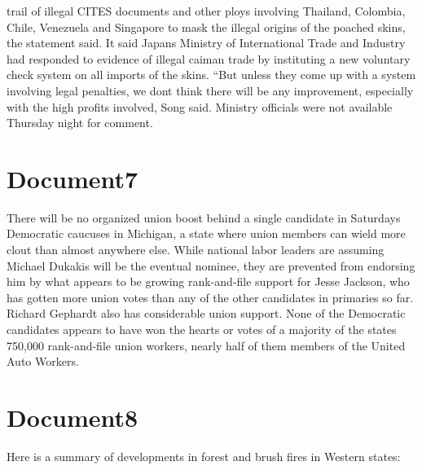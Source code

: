 \documentclass{article}
\begin{document}
\color[rgb]{0.5529411764705883,0.9490196078431372,0.9137254901960784}trail of illegal CITES documents and other ploys involving Thailand, \color[rgb]{0.9137254901960784,0.34509803921568627,0.1568627450980392}Colombia, Chile, \color[rgb]{0.7333333333333333,0.09803921568627451,0.40784313725490196}Venezuela and Singapore to \color[rgb]{0.5529411764705883,0.9490196078431372,0.9137254901960784}mask the illegal origins of the poached skins, the statement said. It said \color[rgb]{0.9647058823529412,0.1568627450980392,0.9411764705882353}Japans Ministry of International Trade and \color[rgb]{0.5529411764705883,0.9490196078431372,0.9137254901960784}Industry had responded to evidence of illegal caiman trade by instituting a new voluntary check system on all \color[rgb]{0.9647058823529412,0.1568627450980392,0.9411764705882353}imports of the \color[rgb]{0.5529411764705883,0.9490196078431372,0.9137254901960784}skins. ``But unless they come up with a system involving legal penalties, we dont think there will be any improvement, especially with the high profits involved, \color[rgb]{0.7333333333333333,0.09803921568627451,0.40784313725490196}Song said. Ministry officials were not available Thursday night for comment. 

\color[rgb]{0,0,0}\section{Document7}
\color[rgb]{0.3333333333333333,0.6588235294117647,0.9686274509803922}There will be no organized union boost behind a single candidate in Saturdays Democratic caucuses in Michigan, a state where union members can wield more clout than almost anywhere else. While national labor leaders are assuming Michael Dukakis will be the eventual nominee, they are prevented from endorsing him by what appears to be growing rank-and-file support for Jesse Jackson, who has gotten more union votes than any of the other candidates in primaries so far. Richard Gephardt also has considerable union support. None of the Democratic candidates appears to have won the hearts  or votes  of a majority of the states 750,000 rank-and-file union workers, nearly half of them members of the United \color[rgb]{0.40784313725490196,0.20784313725490197,0.03529411764705882}Auto Workers. 

\color[rgb]{0,0,0}\section{Document8}
\color[rgb]{0.7333333333333333,0.09803921568627451,0.40784313725490196}Here is a summary of \color[rgb]{0.8666666666666667,0.11372549019607843,0.5411764705882353}developments in \color[rgb]{0.7333333333333333,0.09803921568627451,0.40784313725490196}forest and brush fires in Western states: 
\end{document}
